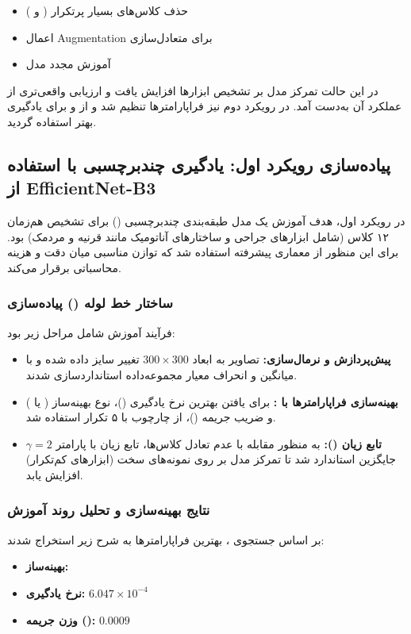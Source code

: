 \documentclass{article}
\begin{document}
\begin{itemize}
	\item حذف کلاس‌های بسیار پرتکرار ( و )
	\item اعمال Augmentation برای متعادل‌سازی
	\item آموزش مجدد مدل
\end{itemize}

در این حالت تمرکز مدل بر تشخیص ابزارها افزایش یافت و ارزیابی واقعی‌تری از عملکرد آن به‌دست آمد. در رویکرد دوم نیز فراپارامترها تنظیم شد و از  و  برای یادگیری بهتر استفاده گردید.

\subsection{پیاده‌سازی رویکرد اول: یادگیری چندبرچسبی با استفاده از EfficientNet-B3}

در رویکرد اول، هدف آموزش یک مدل طبقه‌بندی چندبرچسبی () برای تشخیص هم‌زمان ۱۲ کلاس (شامل ابزارهای جراحی و ساختارهای آناتومیک مانند قرنیه و مردمک) بود. برای این منظور از معماری پیشرفته  استفاده شد که توازن مناسبی میان دقت و هزینه محاسباتی برقرار می‌کند.

\subsubsection{ساختار خط لوله () پیاده‌سازی}
فرآیند آموزش شامل مراحل زیر بود:
\begin{itemize}
	\item \textbf{پیش‌پردازش و نرمال‌سازی:} تصاویر به ابعاد $300 \times 300$ تغییر سایز داده شده و با میانگین و انحراف معیار مجموعه‌داده  استانداردسازی شدند.
	\item \textbf{بهینه‌سازی فراپارامترها با :} برای یافتن بهترین نرخ یادگیری ()، نوع بهینه‌ساز ( یا ) و ضریب جریمه ()، از چارچوب  با ۵ تکرار استفاده شد.
	\item \textbf{تابع زیان ():} به منظور مقابله با عدم تعادل کلاس‌ها، تابع زیان  با پارامتر $\gamma=2$ جایگزین  استاندارد شد تا تمرکز مدل بر روی نمونه‌های سخت (ابزارهای کم‌تکرار) افزایش یابد.
\end{itemize}

\subsubsection{نتایج بهینه‌سازی و تحلیل روند آموزش}
بر اساس جستجوی ، بهترین فراپارامترها به شرح زیر استخراج شدند:
\begin{itemize}
	\item \textbf{بهینه‌ساز:} 
	\item \textbf{نرخ یادگیری:} $6.047 \times 10^{-4}$
	\item \textbf{وزن جریمه ():} $0.0009$
\end{itemize}
\end{document}
